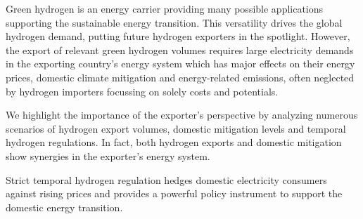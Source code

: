 Green hydrogen is an energy carrier providing many possible applications supporting the sustainable energy transition. 
This versatility drives the global hydrogen demand, putting future hydrogen exporters in the spotlight. 
However, the export of relevant green hydrogen volumes requires large electricity demands in the exporting country's energy system which has major effects on their energy prices, domestic climate mitigation and energy-related emissions, often neglected by hydrogen importers focussing on solely costs and potentials.

We highlight the importance of the exporter's perspective by analyzing numerous scenarios of hydrogen export volumes, domestic \co mitigation levels and temporal hydrogen regulations. In fact, both hydrogen exports and domestic \co mitigation show synergies in the exporter's energy system. 

Strict temporal hydrogen regulation hedges domestic electricity consumers against rising prices and provides a powerful policy instrument to support the domestic energy transition.


